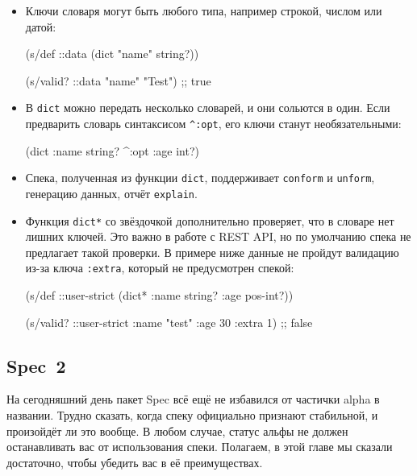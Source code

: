 \begin{itemize}

\item
  Ключи словаря могут быть любого типа, например строкой, числом или датой:

\begin{english}
  \begin{clojure}
(s/def ::data (dict {"name" string?}))

(s/valid? ::data {"name" "Test"})
;; true
  \end{clojure}
\end{english}

\item
  В \verb|dict| можно передать несколько словарей, и они сольются в один. Если
  предварить словарь синтаксисом \verb|^:opt|, его ключи станут необязательными:

\begin{english}
  \begin{clojure}
(dict {:name string?} ^:opt {:age int?})
  \end{clojure}
\end{english}

\item
  Спека, полученная из функции \verb|dict|, поддерживает \verb|conform| и \verb|unform|,
  генерацию данных, отчёт \verb|explain|.

\item
  Функция \verb|dict*| со звёздочкой дополнительно проверяет, что в словаре нет
  лишних ключей. Это важно в работе с REST API, но по умолчанию спека не
  предлагает такой проверки. В примере ниже данные не пройдут валидацию из-за
  ключа \verb|:extra|, который не предусмотрен спекой:

\begin{english}
  \begin{clojure}
(s/def ::user-strict
  (dict* {:name string? :age pos-int?}))

(s/valid? ::user-strict
          {:name "test" :age 30 :extra 1})
;; false
  \end{clojure}
\end{english}

\end{itemize}

\subsection*{Spec~2}

На сегодняшний день пакет Spec всё ещё не избавился от частички alpha в
названии. Трудно сказать, когда спеку официально признают стабильной, и
произойдёт ли это вообще. В любом случае, статус альфы не должен останавливать
вас от использования спеки. Полагаем, в этой главе мы сказали достаточно, чтобы
убедить вас в её преимуществах.


